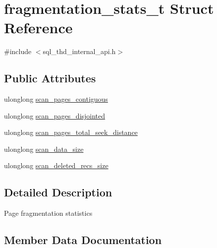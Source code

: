 \hypertarget{structfragmentation__stats__t}{}\section{fragmentation\+\_\+stats\+\_\+t Struct Reference}
\label{structfragmentation__stats__t}


{\ttfamily \#include $<$sql\+\_\+thd\+\_\+internal\+\_\+api.\+h$>$}

\subsection*{Public Attributes}
\begin{DoxyCompactItemize}
\item 
ulonglong \mbox{\hyperlink{structfragmentation__stats__t_a022daf950936a3cd6fa61b07700a45bf}{scan\+\_\+pages\+\_\+contiguous}}
\item 
ulonglong \mbox{\hyperlink{structfragmentation__stats__t_ad24231f2e18012a5759d4ef7b4704033}{scan\+\_\+pages\+\_\+disjointed}}
\item 
ulonglong \mbox{\hyperlink{structfragmentation__stats__t_a6b492cab2ba136ce2633b2178e502f4c}{scan\+\_\+pages\+\_\+total\+\_\+seek\+\_\+distance}}
\item 
ulonglong \mbox{\hyperlink{structfragmentation__stats__t_a18e421801a3c3d1ff46f436075fd8164}{scan\+\_\+data\+\_\+size}}
\item 
ulonglong \mbox{\hyperlink{structfragmentation__stats__t_a3ea87a795e7d41ff9f7d1f20d40d79b2}{scan\+\_\+deleted\+\_\+recs\+\_\+size}}
\end{DoxyCompactItemize}


\subsection{Detailed Description}
Page fragmentation statistics 

\subsection{Member Data Documentation}
\mbox{\label{structfragmentation__stats__t_a18e421801a3c3d1ff46f436075fd8164}} 
